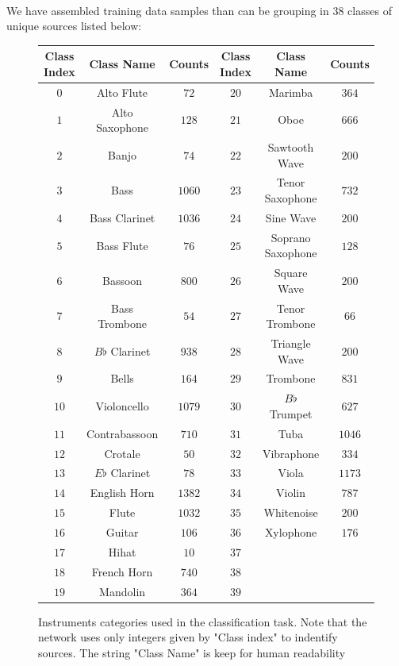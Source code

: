 \documentclass[12pt,letterpaper]{article}
\begin{document}
\paragraph*{}We have assembled training data samples than can be grouping in 38 classes of unique sources listed below:

\begin{figure}[H]
\begin{center}
\begin{tabular}{||c|c|c| |c|c|c||}
\hline
\textbf{Class Index} & \textbf{Class Name} & \textbf{Counts} & \textbf{Class Index} & \textbf{Class Name} & \textbf{Counts} \\
\hline \hline
$0$ & Alto Flute & $72$ 			& $20$ & Marimba & $364$ \\ \hline
$1$ & Alto Saxophone & $128$ 		& $21$ & Oboe & $666$  \\ \hline
$2$ & Banjo & $74$ 					& $22$ & Sawtooth Wave & $200$ \\ \hline
$3$ & Bass & $1060$ 				& $23$ & Tenor Saxophone & $732$ \\ \hline
$4$ & Bass Clarinet & $1036$ 		& $24$ & Sine Wave & $200$ \\ \hline

$5$ & Bass Flute & $76$ 			& $25$ & Soprano Saxophone & $128$\\ \hline
$6$ & Bassoon & $800$ 				& $26$ & Square Wave & $200$ \\ \hline
$7$ & Bass Trombone & $54$ 			& $27$ & Tenor Trombone & $66$ \\ \hline
$8$ & $B\flat$ Clarinet & $938$ 	& $28$ & Triangle Wave & $200$ \\ \hline
$9$ & Bells & $164$ 				& $29$ & Trombone & $831$ \\ \hline

$10$ & Violoncello & $1079$ 		& $30$ & $B\flat$ Trumpet & $627$ \\ \hline
$11$ & Contrabassoon & $710$ 		& $31$ & Tuba & $1046$ \\ \hline
$12$ & Crotale & $50$ 				& $32$ & Vibraphone & $334$ \\ \hline
$13$ & $E\flat$ Clarinet & $78$ 	& $33$ & Viola & $1173$ \\ \hline
$14$ & English Horn & $1382$ 		& $34$ & Violin & $787$ \\ \hline

$15$ & Flute & $1032$ 				& $35$ & Whitenoise & $200$ \\ \hline
$16$ & Guitar & $106$ 				& $36$ & Xylophone & $176$ \\ \hline
$17$ & Hihat & $10$ 				& $37$ & & \\ \hline
$18$ & French Horn & $740$ 			& $38$ & & \\ \hline
$19$ & Mandolin & $364$ 			& $39$ & & \\ \hline

\end{tabular}
\end{center}
\caption{Instruments categories used in the classification task. Note that the network uses only integers given by "Class index" to indentify sources. The string "Class Name" is keep for human readability}
\end{figure}
\end{document}

